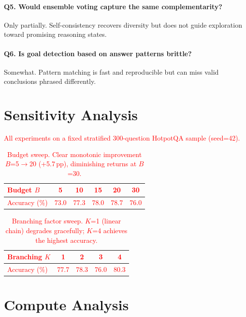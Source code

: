 \documentclass[11pt]{article}
\begin{document}
\paragraph{Q5. Would ensemble voting capture the same complementarity?}
Only partially. Self-consistency recovers diversity but does not guide exploration toward promising reasoning states.

\paragraph{Q6. Is goal detection based on answer patterns brittle?}
Somewhat. Pattern matching is fast and reproducible but can miss valid conclusions phrased differently.

\section{Sensitivity Analysis}
\label{app:sensitivity}

\textcolor{red}{All experiments on a fixed stratified 300-question HotpotQA sample (seed=42).}

\begin{table}[h]
\centering
\small
\textcolor{red}{
\begin{tabular}{lccccc}
\toprule
\textbf{Budget $B$} & 5 & 10 & 15 & 20 & 30 \\
\midrule
Accuracy (\%) & 73.0 & 77.3 & 78.0 & 78.7 & 76.0 \\
\bottomrule
\end{tabular}}
\caption{\textcolor{red}{Budget sweep. Clear monotonic improvement $B$=5$\to$20 (+5.7\,pp), diminishing returns at $B$=30.}}
\label{tab:sensitivity_budget}
\end{table}

\begin{table}[h]
\centering
\small
\textcolor{red}{
\begin{tabular}{lcccc}
\toprule
\textbf{Branching $K$} & 1 & 2 & 3 & 4 \\
\midrule
Accuracy (\%) & 77.7 & 78.3 & 76.0 & 80.3 \\
\bottomrule
\end{tabular}}
\caption{\textcolor{red}{Branching factor sweep. $K$=1 (linear chain) degrades gracefully; $K$=4 achieves the highest accuracy.}}
\label{tab:sensitivity_branch}
\end{table}

\section{Compute Analysis}
\label{app:compute}
\end{document}
